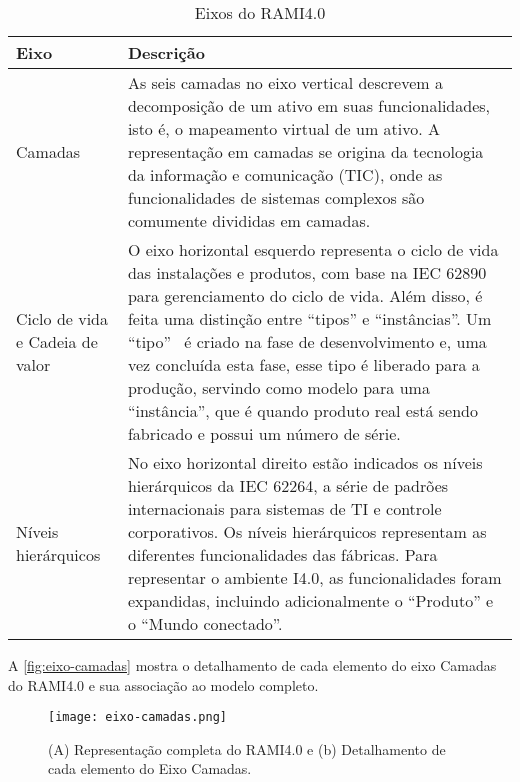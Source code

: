 	\begin{table}[htb]
		\centering
		\footnotesize
		\caption{Eixos do RAMI4.0}
		\label{tab:rami-eixos}
		\begin{tabular}{p{3cm}p{12cm}}
			\hline
			\textbf{Eixo} &\textbf{Descrição} \\
			
			\hline
			Camadas
			& As seis camadas no eixo vertical descrevem a decomposição de um ativo em suas funcionalidades, isto é, o mapeamento virtual de um ativo. A representação em camadas se origina da tecnologia da informação e comunicação (TIC), onde as funcionalidades de sistemas complexos são comumente divididas em camadas. \\
			
			
			\hline
			Ciclo de vida e  Cadeia de valor
			& O eixo horizontal esquerdo representa o ciclo de vida das instalações e produtos, com base na IEC 62890 para gerenciamento do ciclo de vida. Além disso, é feita uma distinção entre ``tipos'' e ``instâncias''. Um ``tipo''~ é criado na fase de desenvolvimento e, uma vez concluída esta fase, esse tipo é liberado para a produção, servindo como modelo para uma ``instância'', que é quando produto real está sendo fabricado e possui um número de série. \\
			
			\hline
			Níveis hierárquicos
			& No eixo horizontal direito estão indicados os níveis hierárquicos da IEC 62264, a série de padrões internacionais para sistemas de TI e controle corporativos. Os níveis hierárquicos representam as diferentes funcionalidades das fábricas. Para representar o ambiente I4.0, as funcionalidades foram expandidas, incluindo adicionalmente o ``Produto'' e o ``Mundo conectado''. \\
			\hline
			
		\end{tabular}
	\end{table}

	A \autoref{fig:eixo-camadas} mostra o detalhamento de cada elemento do eixo Camadas do RAMI4.0 e sua associação ao modelo completo.
	
	\begin{figure}[htb]
		\centering
		\caption{(A) Representação completa do RAMI4.0 e (b) Detalhamento de cada elemento do Eixo Camadas.}
		\label{fig:eixo-camadas}
		\texttt{[image: eixo-camadas.png]}
	\end{figure}

